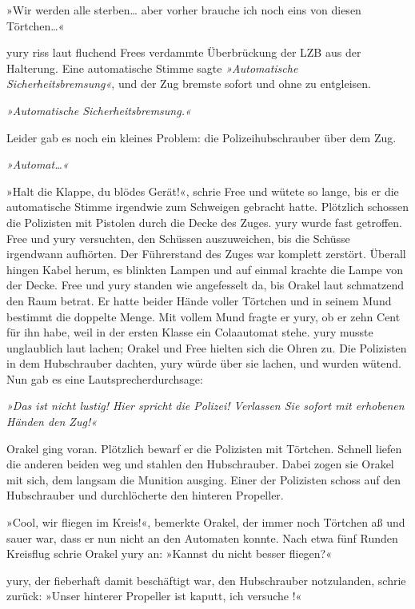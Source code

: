 »Wir werden alle sterben… aber vorher brauche ich noch eins von diesen Törtchen…«

yury riss laut fluchend Frees verdammte Überbrückung der LZB aus der Halterung. Eine automatische Stimme sagte \textit{»Automatische Sicherheitsbremsung«}, und der Zug bremste sofort und ohne zu entgleisen.

\textit{»Automatische Sicherheitsbremsung.«}

Leider gab es noch ein kleines Problem: die Polizeihubschrauber über dem Zug.

\textit{»Automat…«}

»Halt die Klappe, du blödes Gerät!«, schrie Free und wütete so lange, bis er die automatische Stimme irgendwie zum Schweigen gebracht hatte. Plötzlich schossen die Polizisten mit Pistolen durch die Decke des Zuges. yury wurde fast getroffen. Free und yury versuchten, den Schüssen auszuweichen, bis die Schüsse irgendwann aufhörten. Der Führerstand des Zuges war komplett zerstört. Überall hingen Kabel herum, es blinkten Lampen und auf einmal krachte die Lampe von der Decke. Free und yury standen wie angefesselt da, bis Orakel laut schmatzend den Raum betrat. Er hatte beider Hände voller Törtchen und in seinem Mund bestimmt die doppelte Menge. Mit vollem Mund fragte er yury, ob er zehn Cent für ihn habe, weil in der ersten Klasse ein Colaautomat stehe. yury musste unglaublich laut lachen; Orakel und Free hielten sich die Ohren zu. Die Polizisten in dem Hubschrauber dachten, yury würde über sie lachen, und wurden wütend. Nun gab es eine Lautsprecherdurchsage:

\textit{»Das ist nicht lustig! Hier spricht die Polizei! Verlassen Sie sofort mit erhobenen Händen den Zug!«}

Orakel ging voran. Plötzlich bewarf er die Polizisten mit Törtchen. Schnell liefen die anderen beiden weg und stahlen den Hubschrauber. Dabei zogen sie Orakel mit sich, dem langsam die Munition ausging. Einer der Polizisten schoss auf den Hubschrauber und durchlöcherte den hinteren Propeller.

»Cool, wir fliegen im Kreis!«, bemerkte Orakel, der immer noch Törtchen aß und sauer war, dass er nun nicht an den Automaten konnte. Nach etwa fünf Runden Kreisflug schrie Orakel yury an: »Kannst du nicht besser fliegen?«

yury, der fieberhaft damit beschäftigt war, den Hubschrauber notzulanden, schrie zurück: »Unser hinterer Propeller ist kaputt, ich versuche !«

